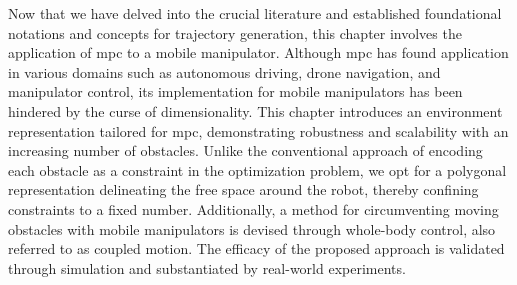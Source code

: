 Now that we have delved into the crucial literature and established foundational
notations and concepts for trajectory generation, this chapter involves
the application of \acl{mpc} to a mobile manipulator.
Although \ac{mpc} has found application in various domains such as autonomous
driving, drone navigation, and manipulator control, its implementation for
mobile manipulators has been hindered by the curse of dimensionality. This
chapter introduces an environment representation tailored for \ac{mpc},
demonstrating robustness and scalability with an increasing number of obstacles.
Unlike the conventional approach of encoding each obstacle as a constraint in
the optimization problem, we opt for a polygonal representation delineating the
free space around the robot, thereby confining constraints to a fixed number.
Additionally, a method for circumventing moving obstacles with mobile
manipulators is devised through whole-body control, also referred to as
coupled motion. The efficacy of the proposed approach is validated through
simulation and substantiated by real-world experiments.
